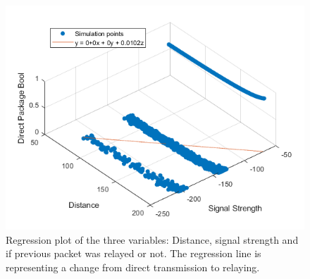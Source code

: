 \begin{figure}[H]
	\centering
	\includegraphics[width=\linewidth]{theory/protocolDecisionExample/fig/regressionPlot.png}
	\caption{Regression plot of the three variables: Distance, signal strength and if previous packet was relayed or not. The regression line is representing a change from direct transmission to relaying.}
	\label{fig:regressionPlot}
\end{figure}